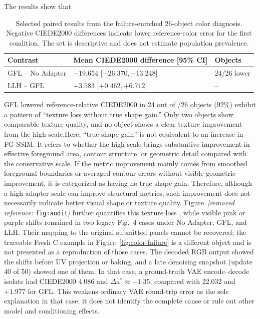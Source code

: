 \documentclass[times,twocolumn,final]{elsarticle}
\providecommand{\DIFadd}[1]{{\protect\color{blue} \sf #1}} %
\providecommand{\DIFdel}[1]{{\protect\color{red} \scriptsize #1}} %
\providecommand{\DIFaddbegin}{} %
\providecommand{\DIFaddend}{} %
\providecommand{\DIFdelbegin}{} %
\providecommand{\DIFdelend}{} %
\begin{document}
\DIFdelbegin \DIFdel{The results show that }\DIFdelend \DIFaddbegin \begin{table}[t]
\centering
\scriptsize
\setlength{\tabcolsep}{3pt}
\caption{Selected paired results from the failure-enriched 26-object color diagnosis. Negative CIEDE2000 differences indicate lower reference-color error for the first condition. The set is descriptive and does not estimate population prevalence.}
\label{tab:color-summary}
\begin{tabular}{p{2.3cm}p{3.3cm}p{1.3cm}}
\toprule
Contrast & Mean CIEDE2000 difference [95\% CI] & Objects \\
\midrule
GFL -- No Adapter & $-19.654$ [$-26.370,-13.248$] & 24/26 lower \\
LLH -- GFL & $+3.583$ [$+0.462,+6.712$] & -- \\
\bottomrule
\end{tabular}
\end{table}

\DIFadd{GFL lowered reference-relative CIEDE2000 in }\DIFaddend 24\DIFdelbegin \DIFdel{out of }\DIFdelend \DIFaddbegin \DIFadd{/}\DIFaddend 26 objects\DIFdelbegin \DIFdel{(92\%) exhibit a pattern of ``texture loss without true shape gain.'' Only two objects show comparable texture quality, and no object shows a clear texture improvement from the high scale.Here, ``true shape gain'' is not equivalent to an increase in FG-SSIM. It refers to whether the high scale brings substantive improvement in effective foreground area, contour structure, or geometric detail compared with the conservative scale. If the metric improvement mainly comes from smoothed foreground boundaries or averaged contour errors without visible geometric improvement, it is categorized as having no true shape gain. Therefore, although a high adapter scale can improve structural metrics, such improvement does not necessarily indicate better visual shape or texture quality. Figure~\textit{[removed reference: }\texttt{fig:audit}\textit{]} further quantifies this texture loss}\DIFdelend \DIFaddbegin \DIFadd{, while visible pink or purple shifts remained in two legacy Fig.~4 cases under No Adapter, GFL, and LLH. Their mapping to the original submitted panels cannot be recovered; the traceable Fresh C example in Figure~\ref{fig:color-failure} is a different object and is not presented as a reproduction of those cases. The decoded RGB output showed the shifts before UV projection or baking, and a late denoising snapshot (update 40 of 50) showed one of them. In that case, a ground-truth VAE encode--decode isolate had CIEDE2000 4.086 and $\Delta a^*\approx-1.35$, compared with 22.032 and $+1.977$ for GFL. This weakens ordinary VAE round-trip error as the sole explanation in that case; it does not identify the complete cause or rule out other model and conditioning effects}\DIFaddend .
\end{document}
